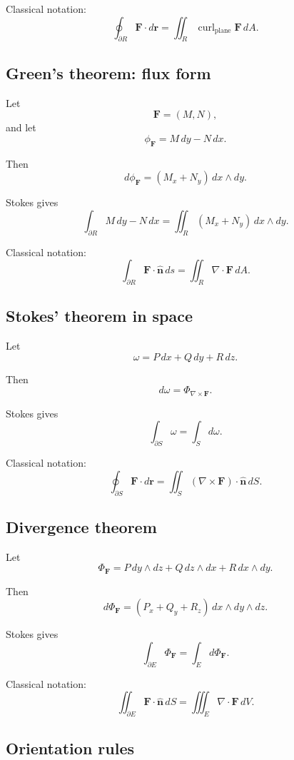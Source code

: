 Classical notation:
\[
\boxed{
    \oint_{\partial R}\mathbf F\cdot d\mathbf r
    =
    \iint_R \operatorname{curl}_{\mathrm{plane}}\mathbf F\,dA.
}
\]

\subsection*{Green's theorem: flux form}

Let
\[
    \mathbf F=(M,N),
\]
and let
\[
    \phi_{\mathbf F}=M\,dy-N\,dx.
\]

Then
\[
    d\phi_{\mathbf F}=(M_x+N_y)\,dx\wedge dy.
\]

Stokes gives
\[
\boxed{
    \int_{\partial R}M\,dy-N\,dx
    =
    \iint_R (M_x+N_y)\,dx\wedge dy.
}
\]

Classical notation:
\[
\boxed{
    \int_{\partial R}\mathbf F\cdot\widehat{\mathbf n}\,ds
    =
    \iint_R \nabla\cdot\mathbf F\,dA.
}
\]

\subsection*{Stokes' theorem in space}

Let
\[
    \omega=P\,dx+Q\,dy+R\,dz.
\]

Then
\[
    d\omega=\Phi_{\nabla\times\mathbf F}.
\]

Stokes gives
\[
\boxed{
    \int_{\partial S}\omega
    =
    \int_S d\omega.
}
\]

Classical notation:
\[
\boxed{
    \oint_{\partial S}\mathbf F\cdot d\mathbf r
    =
    \iint_S(\nabla\times\mathbf F)\cdot\widehat{\mathbf n}\,dS.
}
\]

\subsection*{Divergence theorem}

Let
\[
    \Phi_{\mathbf F}
    =
    P\,dy\wedge dz+Q\,dz\wedge dx+R\,dx\wedge dy.
\]

Then
\[
    d\Phi_{\mathbf F}
    =
    (P_x+Q_y+R_z)\,dx\wedge dy\wedge dz.
\]

Stokes gives
\[
\boxed{
    \int_{\partial E}\Phi_{\mathbf F}
    =
    \int_E d\Phi_{\mathbf F}.
}
\]

Classical notation:
\[
\boxed{
    \iint_{\partial E}\mathbf F\cdot\widehat{\mathbf n}\,dS
    =
    \iiint_E\nabla\cdot\mathbf F\,dV.
}
\]

\subsection*{Orientation rules}

